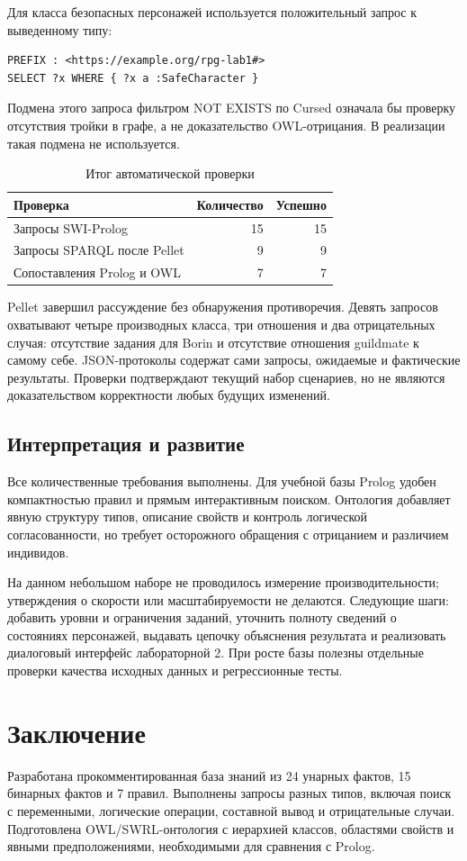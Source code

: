 Для класса безопасных персонажей используется положительный запрос к выведенному типу:
\begin{lstlisting}
PREFIX : <https://example.org/rpg-lab1#>
SELECT ?x WHERE { ?x a :SafeCharacter }
\end{lstlisting}
Подмена этого запроса фильтром NOT EXISTS по Cursed означала бы проверку отсутствия тройки в графе, а не доказательство OWL-отрицания. В реализации такая подмена не используется.

\begin{table}[ht]
\centering\small
\begin{tabularx}{\textwidth}{@{}Xrr@{}}
\toprule
Проверка & Количество & Успешно\\
\midrule
Запросы SWI-Prolog & 15 & 15\\
Запросы SPARQL после Pellet & 9 & 9\\
Сопоставления Prolog и OWL & 7 & 7\\
\bottomrule
\end{tabularx}
\caption{Итог автоматической проверки}
\end{table}
Pellet завершил рассуждение без обнаружения противоречия. Девять запросов охватывают четыре производных класса, три отношения и два отрицательных случая: отсутствие задания для Borin и отсутствие отношения guildmate к самому себе. JSON-протоколы содержат сами запросы, ожидаемые и фактические результаты. Проверки подтверждают текущий набор сценариев, но не являются доказательством корректности любых будущих изменений.

\subsection{Интерпретация и развитие}
Все количественные требования выполнены. Для учебной базы Prolog удобен компактностью правил и прямым интерактивным поиском. Онтология добавляет явную структуру типов, описание свойств и контроль логической согласованности, но требует осторожного обращения с отрицанием и различием индивидов.

На данном небольшом наборе не проводилось измерение производительности; утверждения о скорости или масштабируемости не делаются. Следующие шаги: добавить уровни и ограничения заданий, уточнить полноту сведений о состояниях персонажей, выдавать цепочку объяснения результата и реализовать диалоговый интерфейс лабораторной 2. При росте базы полезны отдельные проверки качества исходных данных и регрессионные тесты.

\section{Заключение}
Разработана прокомментированная база знаний из 24 унарных фактов, 15 бинарных фактов и 7 правил. Выполнены запросы разных типов, включая поиск с переменными, логические операции, составной вывод и отрицательные случаи. Подготовлена OWL/SWRL-онтология с иерархией классов, областями свойств и явными предположениями, необходимыми для сравнения с Prolog.

